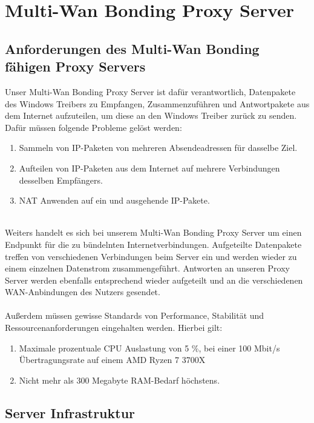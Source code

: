 \chapter{Multi-Wan Bonding Proxy Server}
\label{cha:Multi-WanBondingProxyServer}

\section{Anforderungen des Multi-Wan Bonding fähigen Proxy Servers}
Unser Multi-Wan Bonding Proxy Server ist dafür verantwortlich, Datenpakete des Windows Treibers zu Empfangen, Zusammenzuführen und Antwortpakete aus dem Internet aufzuteilen, um diese an den Windows Treiber zurück zu senden. Dafür müssen folgende Probleme gelöst werden:
\\
\begin{enumerate}
    \item Sammeln von IP-Paketen von mehreren Absendeadressen für dasselbe Ziel.
    \item Aufteilen von IP-Paketen aus dem Internet auf mehrere Verbindungen desselben Empfängers.
    \item NAT Anwenden auf ein und ausgehende IP-Pakete.
\end{enumerate}
\ \\
Weiters handelt es sich bei unserem Multi-Wan Bonding Proxy Server um einen Endpunkt für die zu bündelnten Internetverbindungen. Aufgeteilte Datenpakete treffen von verschiedenen Verbindungen beim Server ein und werden wieder zu einem einzelnen Datenstrom zusammengeführt. Antworten an unseren Proxy Server werden ebenfalls entsprechend wieder aufgeteilt und an die verschiedenen WAN-Anbindungen des Nutzers gesendet. 
\\\\
Außerdem müssen gewisse Standards von Performance, Stabilität und Ressourcenanforderungen eingehalten werden. Hierbei gilt:
\\
\begin{enumerate}
    \item Maximale prozentuale CPU Auslastung von 5 {\%}, bei einer 100 Mbit/s Übertragungsrate auf einem AMD Ryzen 7 3700X
    \item Nicht mehr als 300 Megabyte RAM-Bedarf höchstens.
\end{enumerate}

\newpage
\section{Server Infrastruktur}
